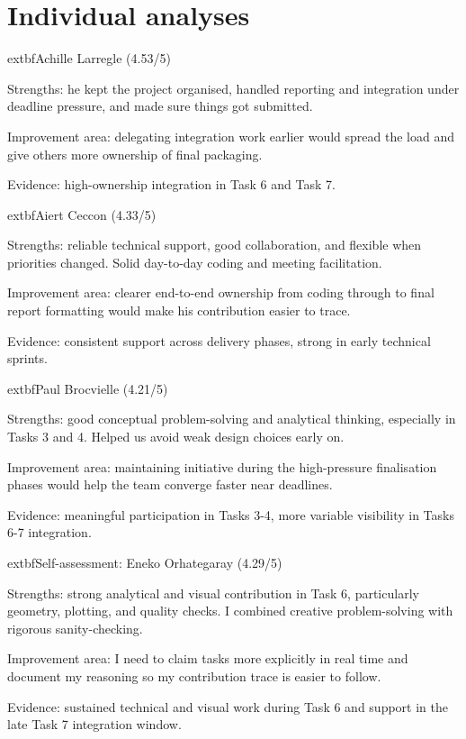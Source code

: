 \section{Individual analyses}


\noindent 	extbf{Achille Larregle (4.53/5)}

\noindent Strengths: he kept the project organised, handled reporting and integration under deadline pressure, and made sure things got submitted.

\noindent Improvement area: delegating integration work earlier would spread the load and give others more ownership of final packaging.

\noindent Evidence: high-ownership integration in Task 6 and Task 7.


\noindent 	extbf{Aiert Ceccon (4.33/5)}

\noindent Strengths: reliable technical support, good collaboration, and flexible when priorities changed. Solid day-to-day coding and meeting facilitation.

\noindent Improvement area: clearer end-to-end ownership from coding through to final report formatting would make his contribution easier to trace.

\noindent Evidence: consistent support across delivery phases, strong in early technical sprints.


\noindent 	extbf{Paul Brocvielle (4.21/5)}

\noindent Strengths: good conceptual problem-solving and analytical thinking, especially in Tasks 3 and 4. Helped us avoid weak design choices early on.

\noindent Improvement area: maintaining initiative during the high-pressure finalisation phases would help the team converge faster near deadlines.

\noindent Evidence: meaningful participation in Tasks 3-4, more variable visibility in Tasks 6-7 integration.


\noindent 	extbf{Self-assessment: Eneko Orhategaray (4.29/5)}

\noindent Strengths: strong analytical and visual contribution in Task 6, particularly geometry, plotting, and quality checks. I combined creative problem-solving with rigorous sanity-checking.

\noindent Improvement area: I need to claim tasks more explicitly in real time and document my reasoning so my contribution trace is easier to follow.

\noindent Evidence: sustained technical and visual work during Task 6 and support in the late Task 7 integration window.


